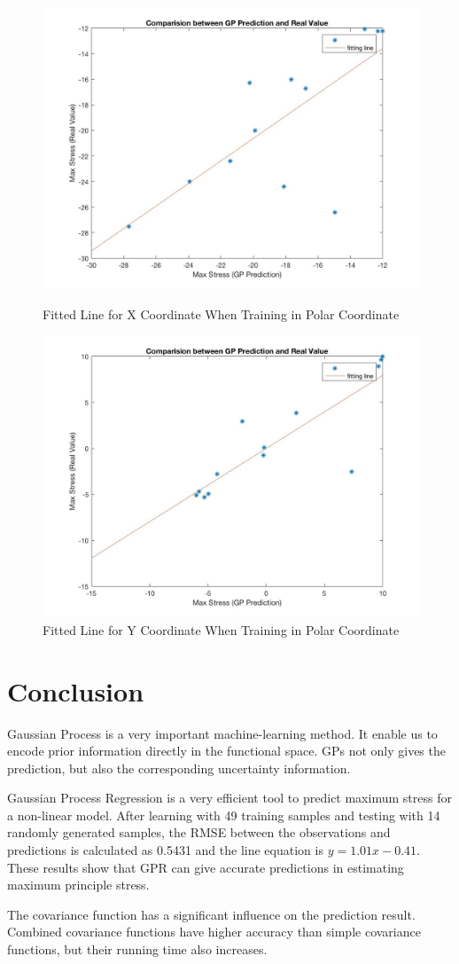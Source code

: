 \documentclass[conference]{IEEEtran}
\begin{document}
\begin{figure} 
\centering
\includegraphics[width=3.4 in,height=2.5 in]{121_x.jpg}
\caption{Fitted Line for X Coordinate When Training in Polar Coordinate}
\includegraphics[width=3.4 in,height=2.5 in]{121_y.jpg}
\caption{Fitted Line for Y Coordinate When Training in Polar Coordinate}
\label{fig:graph}
\end{figure}

\section{Conclusion}
Gaussian Process is a very important machine-learning method. It enable us to encode prior information directly in the functional space. GPs not only gives the prediction, but also the corresponding uncertainty information.

Gaussian Process Regression is a very efficient tool to predict maximum stress for a non-linear model. After learning with 49 training samples and testing with 14 randomly generated samples, the RMSE between the observations and predictions is calculated as 0.5431 and the line equation is $y=1.01x-0.41$. These results show that GPR can give accurate predictions in estimating maximum principle stress.

The covariance function has a significant influence on the prediction result. Combined covariance functions have higher accuracy than simple covariance functions, but their running time also increases.
\end{document}
